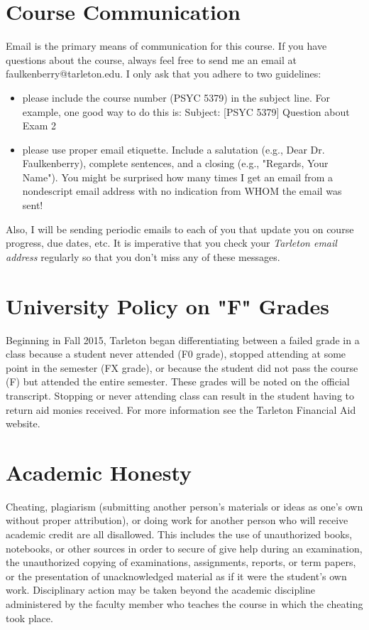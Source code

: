 \documentclass[10pt]{article}
\begin{document}
\section*{Course Communication}
\label{sec:org5be4c46}

Email is the primary means of communication for this course.  If you have questions about the course, always feel free to send me an email at faulkenberry@tarleton.edu.  I only ask that you adhere to two guidelines:
\begin{itemize}
\item please include the course number (PSYC 5379) in the subject line.  For example, one good way to do this is:  Subject: [PSYC 5379] Question about Exam 2
\item please use proper email etiquette.  Include a salutation (e.g., Dear Dr. Faulkenberry), complete sentences, and a closing (e.g., "Regards, Your Name").  You might be surprised how many times I get an email from a nondescript email address with no indication from WHOM the email was sent!
\end{itemize}

Also, I will be sending periodic emails to each of you that update you on course progress, due dates, etc. It is imperative that you check your \emph{Tarleton email address} regularly so that you don't miss any of these messages.

\section*{University Policy on "F" Grades}
\label{sec:orgd294dd6}
Beginning in Fall 2015, Tarleton began differentiating between a failed grade in a class because a student never attended (F0 grade), stopped attending at some point in the semester (FX grade), or because the student did not pass the course (F) but attended the entire semester. These grades will be noted on the official transcript. Stopping or never attending class can result in the student having to return aid monies received.  For more information see the Tarleton Financial Aid website.

\section*{Academic Honesty}
\label{sec:org6d6dbdb}

Cheating, plagiarism (submitting another person’s materials or ideas as one’s own without proper attribution), or doing work for another person who will receive academic credit are all disallowed. This includes the use of unauthorized books, notebooks, or other sources in order to secure of give help during an examination, the unauthorized copying of examinations, assignments, reports, or term papers, or the presentation of unacknowledged material as if it were the student’s own work. Disciplinary action may be taken beyond the academic discipline administered by the faculty member who teaches the course in which the cheating took place.
\end{document}
